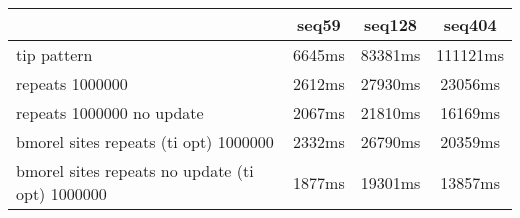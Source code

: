 \begin{tabular}{|l|c|c|c|}
\hline
 & seq59 & seq128 & seq404  \\
\hline
tip pattern &  6645ms &  83381ms &  111121ms\\
\hline
repeats 1000000 &  2612ms &  27930ms &  23056ms\\
\hline
repeats 1000000 no update &  2067ms &  21810ms &  16169ms\\
\hline
bmorel sites repeats (ti opt) 1000000 &  2332ms &  26790ms &  20359ms\\
\hline
bmorel sites repeats no update (ti opt) 1000000 &  1877ms &  19301ms &  13857ms\\
\hline
\end{tabular}
